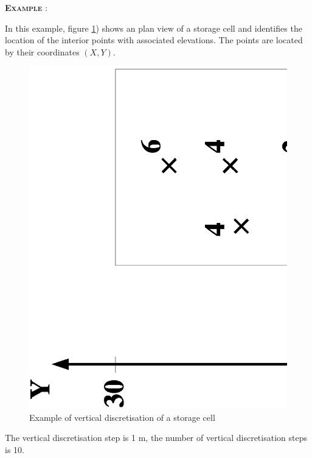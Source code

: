 \textsc{\textbf{Example}} :

\vspace{0.25cm}

In this example, figure \ref{PlanimCasier}) shows an plan view of a storage cell and identifies the location of the interior points with associated elevations. The points are located by their coordinates $(X,Y)$.

\begin{figure}
    \begin{center}
     \includegraphics[scale=0.4,angle=270]{Figures/PlanimCasier.eps}
     \vspace{1.cm}
     \caption{Example of vertical discretisation of a storage cell}
     \label{PlanimCasier}
    \end{center}
\end{figure}

The vertical discretisation step is 1 m, the number of vertical discretisation steps is 10.

